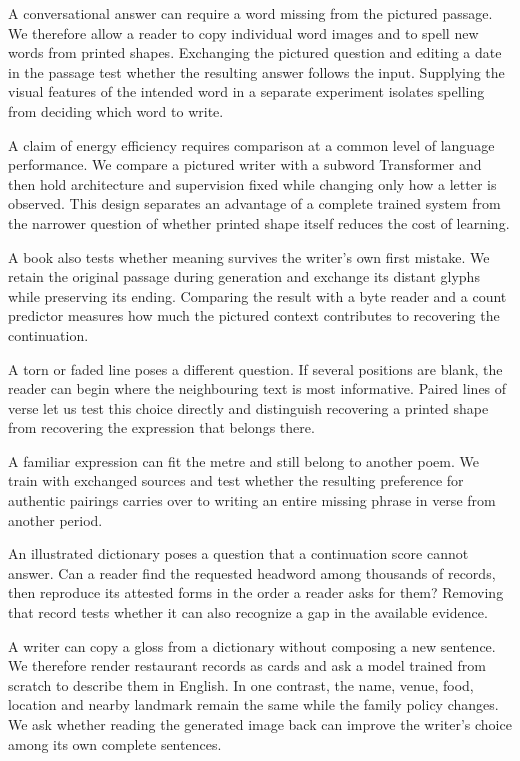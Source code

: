 A conversational answer can require a word missing from the pictured passage. We therefore allow a reader to copy individual word images and to spell new words from printed shapes. Exchanging the pictured question and editing a date in the passage test whether the resulting answer follows the input. Supplying the visual features of the intended word in a separate experiment isolates spelling from deciding which word to write.

A claim of energy efficiency requires comparison at a common level of language performance. We compare a pictured writer with a subword Transformer and then hold architecture and supervision fixed while changing only how a letter is observed. This design separates an advantage of a complete trained system from the narrower question of whether printed shape itself reduces the cost of learning.

A book also tests whether meaning survives the writer's own first mistake. We retain the original passage during generation and exchange its distant glyphs while preserving its ending. Comparing the result with a byte reader and a count predictor measures how much the pictured context contributes to recovering the continuation.

A torn or faded line poses a different question. If several positions are blank, the reader can begin where the neighbouring text is most informative. Paired lines of verse let us test this choice directly and distinguish recovering a printed shape from recovering the expression that belongs there.

A familiar expression can fit the metre and still belong to another poem. We train with exchanged sources and test whether the resulting preference for authentic pairings carries over to writing an entire missing phrase in verse from another period.

An illustrated dictionary poses a question that a continuation score cannot answer. Can a reader find the requested headword among thousands of records, then reproduce its attested forms in the order a reader asks for them? Removing that record tests whether it can also recognize a gap in the available evidence.


A writer can copy a gloss from a dictionary without composing a new sentence. We therefore render restaurant records as cards and ask a model trained from scratch to describe them in English. In one contrast, the name, venue, food, location and nearby landmark remain the same while the family policy changes. We ask whether reading the generated image back can improve the writer's choice among its own complete sentences.

